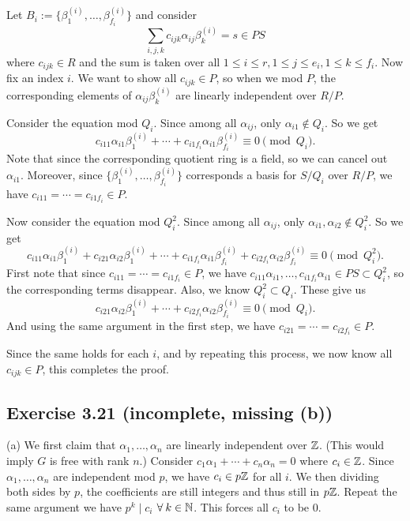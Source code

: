 \documentclass[../Marcus.tex]{subfiles}
\begin{document}
Let $B_i:=\{\beta^{(i)}_1,\ldots,\beta^{(i)}_{f_i}\}$ and consider 
$$
\sum_{i,j,k} c_{ijk}\alpha_{ij}\beta^{(i)}_k=s\in PS
$$ 
where $c_{ijk}\in R$ and the sum is taken over all $1\leq i\leq r,1\leq j\leq e_i,1\leq k\leq f_i$. Now fix an index $i$. We want to show all $c_{ijk}\in P$, so when we mod $P$, the corresponding elements of $\alpha_{ij}\beta^{(i)}_k$ are linearly independent over $R/P$.

Consider the equation mod $Q_i$. Since among all $\alpha_{ij}$, only $\alpha_{i1}\notin Q_i$. So we get 
$$
c_{i11}\alpha_{i1}\beta^{(i)}_1+\cdots+c_{i1f_i}\alpha_{i1}\beta^{(i)}_{f_i}\equiv0\pmod{Q_i}.
$$ 
Note that since the corresponding quotient ring is a field, so we can cancel out $\alpha_{i1}$. Moreover, since $\{\beta^{(i)}_1,\ldots,\beta^{(i)}_{f_i}\}$ corresponds a basis for $S/Q_i$ over $R/P$, we have $c_{i11}=\cdots=c_{i1f_i}\in P$.

Now consider the equation mod $Q^2_i$. Since among all $\alpha_{ij}$, only $\alpha_{i1},\alpha_{i2}\notin Q^2_i$. So we get 
$$
c_{i11}\alpha_{i1}\beta^{(i)}_1+c_{i21}\alpha_{i2}\beta^{(i)}_1+\cdots+c_{i1f_i}\alpha_{i1}\beta^{(i)}_{f_i}+c_{i2f_i}\alpha_{i2}\beta^{(i)}_{f_i}\equiv0\pmod{Q^2_i}.
$$ 
First note that since $c_{i11}=\cdots=c_{i1f_i}\in P$, we have $c_{i11}\alpha_{i1},\ldots,c_{i1f_i}\alpha_{i1}\in PS\subset Q^2_i$, so the corresponding terms disappear. Also, we know $Q_i^2\subset Q_i$. These give us 
$$
c_{i21}\alpha_{i2}\beta^{(i)}_1+\cdots+c_{i2f_i}\alpha_{i2}\beta^{(i)}_{f_i}\equiv0\pmod{Q_i}.
$$ 
And using the same argument in the first step, we have $c_{i21}=\cdots=c_{i2f_i}\in P$.

Since the same holds for each $i$, and by repeating this process, we now know all $c_{ijk}\in P$, this completes the proof. 

\subsection*{Exercise 3.21 \color{red}(incomplete, missing (b))}

(a) We first claim that $\alpha_1,\ldots,\alpha_n$ are linearly independent over $\mathbb{Z}$. (This would imply $G$ is free with rank $n$.) Consider $c_1\alpha_1+\cdots+c_n\alpha_n=0$ where $c_i\in\mathbb{Z}$. Since $\alpha_1,\ldots,\alpha_n$ are independent mod $p$, we have $c_i\in p\mathbb{Z}$ for all $i$. We then dividing both sides by $p$, the coefficients are still integers and thus still in $p\mathbb{Z}$. Repeat the same argument we have $p^k\mid c_i$ $\forall k\in\NN$. This forces all $c_i$ to be 0.
\end{document}
